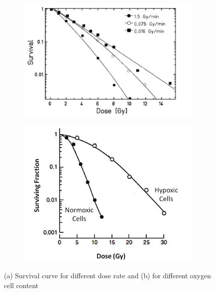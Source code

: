             \begin{figure}
                \centering
                \begin{subfigure}[b]{0.49\textwidth}
                    \centering
                    \includegraphics[width=\linewidth]{figures/pixel_detectors_usage/survival_curve.png}                    
                    \caption{}
                    \label{fig:survival_dose}
                \end{subfigure}
                \hfill
                \begin{subfigure}[b]{0.39\textwidth}
                    \centering
                    \includegraphics[width=\linewidth]{figures/pixel_detectors_usage/survival_curve_oxygen.png}                    
                    \caption{}
                    \label{fig:survival_oxygen}
                \end{subfigure}
                \caption{(a) Survival curve for different dose rate and (b) for different oxygen cell content }
                \label{fig:damage_vs_dose}
           \end{figure}


